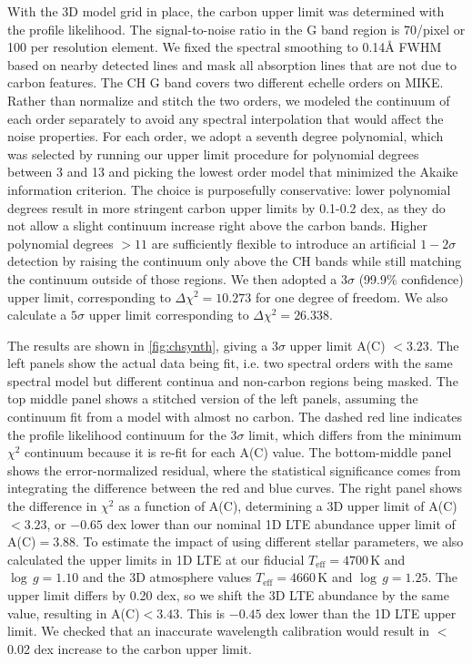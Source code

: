 \documentclass{natureprintstyle}
\newcommand{\teff}{\ensuremath{T_\mathrm{eff}}\xspace}
\newcommand{\Teff}{\teff}
\newcommand{\logg}{\ensuremath{\log\,g}\xspace}
\begin{document}
With the 3D model grid in place, the carbon upper limit was determined with the profile likelihood.
The signal-to-noise ratio in the G band region is 70/pixel or 100 per resolution element.
We fixed the spectral smoothing to 0.14{\AA} FWHM based on nearby detected lines and mask all absorption lines that are not due to carbon features.
The CH G band covers two different echelle orders on MIKE. Rather than normalize and stitch the two orders, we modeled the continuum of each order separately to avoid any spectral interpolation that would affect the noise properties. For each order, we adopt a seventh degree polynomial, which was selected by running our upper limit procedure for polynomial degrees between 3 and 13 and picking the lowest order model that minimized the Akaike information criterion\cite{Akaike1976}. The choice is purposefully conservative: lower polynomial degrees result in more stringent carbon upper limits by 0.1-0.2 dex, as they do not allow a slight continuum increase right above the carbon bands. Higher polynomial degrees $>11$ are sufficiently flexible to introduce an artificial $1-2\sigma$ detection by raising the continuum only above the CH bands while still matching the continuum outside of those regions.
We then adopted a $3\sigma$ (99.9\% confidence) upper limit, corresponding to $\Delta \chi^2 = 10.273$ for one degree of freedom. We also calculate a $5\sigma$ upper limit corresponding to $\Delta \chi^2 = 26.338$.

The results are shown in \ref{fig:chsynth}, giving a $3\sigma$ upper limit A(C) $< 3.23$.
The left panels show the actual data being fit, i.e. two spectral orders with the same spectral model but different continua and non-carbon regions being masked. The top middle panel shows a stitched version of the left panels, assuming the continuum fit from a model with almost no carbon. The dashed red line indicates the profile likelihood continuum for the $3\sigma$ limit, which differs from the minimum $\chi^2$ continuum because it is re-fit for each A(C) value.
The bottom-middle panel shows the error-normalized residual, where the statistical significance comes from integrating the difference between the red and blue curves. The right panel shows the difference in $\chi^2$ as a function of A(C), determining a 3D upper limit of A(C)$<3.23$, or $-0.65$ dex lower than our nominal 1D LTE abundance upper limit of A(C)$=3.88$.
To estimate the impact of using different stellar parameters, we also calculated the upper limits in 1D LTE at our fiducial $\Teff=4700$\,K and $\logg=1.10$ and the 3D atmosphere values $\Teff=4660$\,K and $\logg=1.25$. The upper limit differs by 0.20 dex, so we shift the 3D LTE abundance by the same value, resulting in A(C)$ < 3.43$. This is $-0.45$ dex lower than the 1D LTE upper limit.
We checked that an inaccurate wavelength calibration would result in ${<}$0.02 dex increase to the carbon upper limit.
\end{document}
